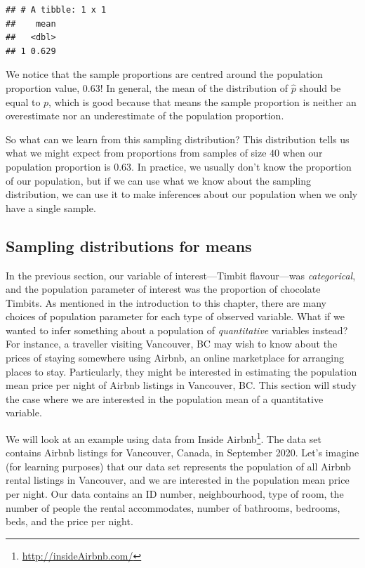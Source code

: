 \documentclass[
]{krantz}
\renewcommand{\href}[2]{#2\footnote{\url{#1}}}
\begin{document}
\begin{verbatim}
## # A tibble: 1 x 1
##    mean
##   <dbl>
## 1 0.629
\end{verbatim}

We notice that the sample proportions are centred around the population proportion value, 0.63! In general, the mean of the distribution of \(\hat{p}\) should be equal to \(p\), which is good because that means the sample proportion is neither an overestimate nor an underestimate of the population proportion.

So what can we learn from this sampling distribution? This distribution tells us what we might expect from proportions from samples of size \(40\) when our population proportion is 0.63. In practice, we usually don't know the proportion of our population, but if we can use what we know about the sampling distribution, we can use it to make inferences about our population when we only have a single sample.

\hypertarget{sampling-distributions-for-means}{%
\subsection{Sampling distributions for means}\label{sampling-distributions-for-means}}

In the previous section, our variable of interest---Timbit flavour---was
\emph{categorical}, and the population parameter of interest was the proportion of chocolate
Timbits. As mentioned in the introduction to this chapter, there are many choices of population parameter for each type of observed variable. What if we wanted to infer something about a population of \emph{quantitative} variables instead? For instance, a traveller visiting Vancouver, BC may wish to know about the prices of staying somewhere using Airbnb, an online marketplace for arranging places to stay. Particularly, they might be interested in estimating the population mean price per night of Airbnb listings in Vancouver, BC. This section will study the case where we are interested in the population mean of a quantitative variable.

We will look at an example using data from \href{http://insideAirbnb.com/}{Inside Airbnb}. The data set contains Airbnb listings for Vancouver, Canada, in September 2020. Let's imagine (for learning purposes) that our data set represents the population of all Airbnb rental listings in Vancouver, and we are interested in the population mean price per night.
Our data contains an ID number, neighbourhood,
type of room, the number of people the rental accommodates, number of bathrooms, bedrooms, beds, and the price per night.
\end{document}
